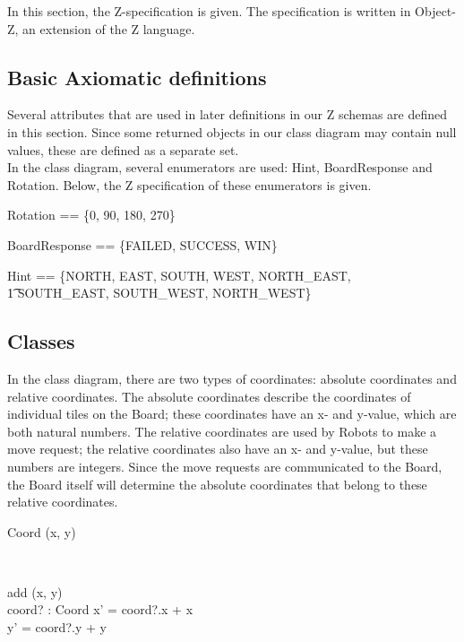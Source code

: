 In this section, the Z-specification is given. The specification is written in Object-Z, an extension of the Z language.

\subsection{Basic Axiomatic definitions}
Several attributes that are used in later definitions in our Z schemas are defined in this section. Since some returned objects in our class diagram may contain null values, these are defined as a separate set. \\
In the class diagram, several enumerators are used: Hint, BoardResponse and Rotation. Below, the Z specification of these enumerators is given.

\begin{axdef}
Rotation == \{0, 90, 180, 270\}
\end{axdef}

\begin{axdef}
BoardResponse == \{FAILED, SUCCESS, WIN\}
\end{axdef}

\begin{axdef}
Hint == \{NORTH, EAST, SOUTH, WEST, NORTH\_EAST, \\ \t1 SOUTH\_EAST, SOUTH\_WEST, NORTH\_WEST\}
\end{axdef}

\begin{zed}
[Null]
\end{zed}

\subsection{Classes}
In the class diagram, there are two types of coordinates: absolute coordinates and relative coordinates. The absolute coordinates describe the coordinates of individual tiles on the Board; these coordinates have an x- and y-value, which are both natural numbers. The relative coordinates are used by Robots to make a move request; the relative coordinates also have an x- and y-value, but these numbers are integers. Since the move requests are communicated to the Board, the Board itself will determine the absolute coordinates that belong to these relative coordinates.

\begin{class}{Coord}
\upharpoonright (x, y) \\
 \\
\begin{schema}{add}
\Delta (x, y) \\
coord? : Coord
\where
x' = coord?.x + x \\
y' = coord?.y + y
\end{schema}
\end{class}

